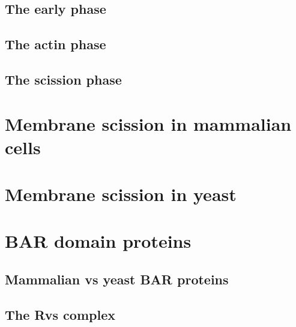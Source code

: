 		\subsection{The early phase}
		\subsection{The actin phase}
		\subsection{The scission phase}
		
		
	\section{Membrane scission in mammalian cells}
	\section{Membrane scission in yeast}
	
		
	\section{BAR domain proteins}
		\subsection{Mammalian vs yeast BAR proteins}
		\subsection{The Rvs complex}		
		
		
	
